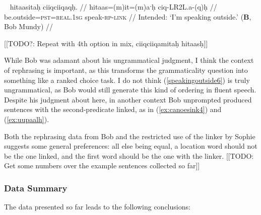 \ex~ \label{speakingoutside6}
\begingl
\glpreamble *hitaasitaḥ ciiqciiqaqḥ. //
\gla hitaas=(m)it=(m)aˑḥ ciq-LR2L.a-(q)ḥ //
\glb be.outside=\textsc{pst}=\textsc{real.1sg} speak-\textsc{rp}-\textsc{link} //
\glft Intended: `I'm speaking outside.' (\textbf{B}, Bob Mundy) //
\endgl
\xe

[[TODO?: Repeat with 4th option in mix, ciiqciiqamitaḥ hitaasḥ]]

While Bob was adamant about his ungrammatical judgment, I think the context of rephrasing is important, as this transforms the grammaticality question into something like a ranked choice task. I do not think (\ref{speakingoutside6}) is truly ungrammatical, as Bob would still generate this kind of ordering in fluent speech. Despite his judgment about here, in another context Bob unprompted produced sentences with the second-predicate linked, as in (\ref{ex:canoesink4}) and (\ref{ex:uupaalh}).

Both the rephrasing data from Bob and the restricted use of the linker by Sophie suggests some general preferences: all else being equal, a location word should not be the one linked, and the first word should be the one with the linker. [[TODO: Get some numbers over the example sentences collected so far]]

\subsubsection{Data Summary}

The data presented so far leads to the following conclusions:

